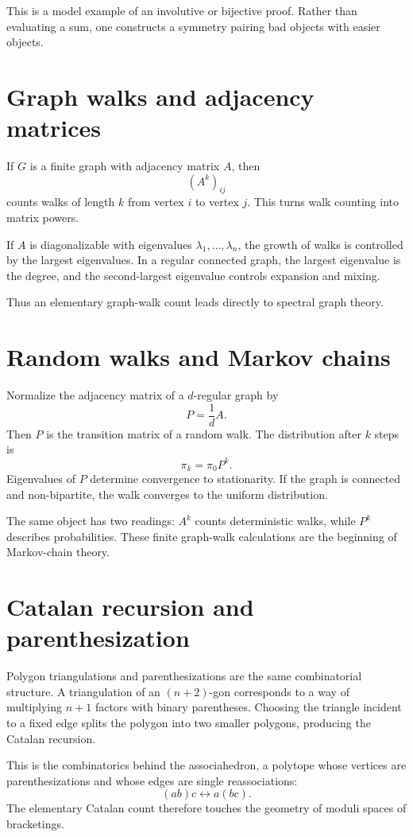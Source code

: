 This is a model example of an involutive or bijective proof.  Rather than evaluating a sum, one constructs a symmetry pairing bad objects with easier objects.

\section{Graph walks and adjacency matrices}

If $G$ is a finite graph with adjacency matrix $A$, then
\[
  (A^k)_{ij}
\]
counts walks of length $k$ from vertex $i$ to vertex $j$.  This turns walk counting into matrix powers.

If $A$ is diagonalizable with eigenvalues $\lambda_1,\ldots,\lambda_n$, the growth of walks is controlled by the largest eigenvalues.  In a regular connected graph, the largest eigenvalue is the degree, and the second-largest eigenvalue controls expansion and mixing.

Thus an elementary graph-walk count leads directly to spectral graph theory.

\section{Random walks and Markov chains}

Normalize the adjacency matrix of a $d$-regular graph by
\[
  P=\frac1d A.
\]
Then $P$ is the transition matrix of a random walk.  The distribution after $k$ steps is
\[
  \pi_k=\pi_0P^k.
\]
Eigenvalues of $P$ determine convergence to stationarity.  If the graph is connected and non-bipartite, the walk converges to the uniform distribution.

The same object has two readings: $A^k$ counts deterministic walks, while $P^k$ describes probabilities.  These finite graph-walk calculations are the beginning of Markov-chain theory.

\section{Catalan recursion and parenthesization}

Polygon triangulations and parenthesizations are the same combinatorial structure.  A triangulation of an $(n+2)$-gon corresponds to a way of multiplying $n+1$ factors with binary parentheses.  Choosing the triangle incident to a fixed edge splits the polygon into two smaller polygons, producing the Catalan recursion.

This is the combinatorics behind the associahedron, a polytope whose vertices are parenthesizations and whose edges are single reassociations:
\[
  (ab)c\leftrightarrow a(bc).
\]
The elementary Catalan count therefore touches the geometry of moduli spaces of bracketings.

